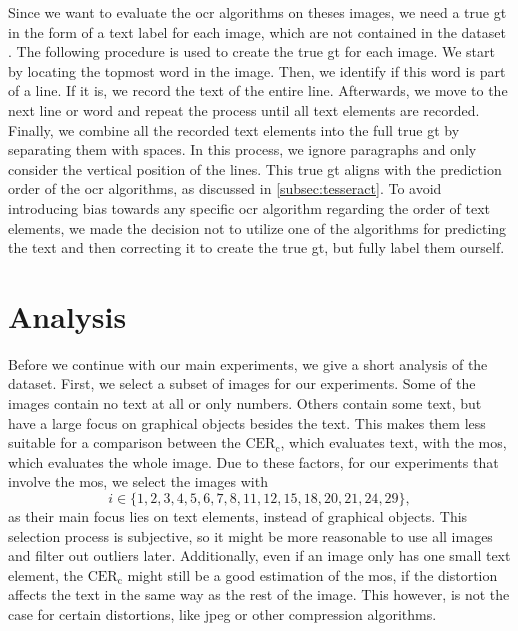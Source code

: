 Since we want to evaluate the \gls{ocr} algorithms on theses images, we need a true \gls{gt} in the form of a text label for each image, which are not contained in the dataset \cite{ni_esim_2017}.
The following procedure is used to create the true \gls{gt} for each image.
We start by locating the topmost word in the image.
Then, we identify if this word is part of a line.
If it is, we record the text of the entire line.
Afterwards, we move to the next line or word and repeat the process until all text elements are recorded.
Finally, we combine all the recorded text elements into the full true \gls{gt} by separating them with spaces.
In this process, we ignore paragraphs and only consider the vertical position of the lines.
This true \gls{gt} aligns with the prediction order of the \gls{ocr} algorithms, as discussed in \autoref{subsec:tesseract}.
To avoid introducing bias towards any specific \gls{ocr} algorithm regarding the order of text elements, we made the decision not to utilize one of the algorithms for predicting the text and then correcting it to create the true \gls{gt}, but fully label them ourself.



\section{Analysis}
\label{sec:dataset_analysis}


Before we continue with our main experiments, we give a short analysis of the dataset.
First, we select a subset of images for our experiments.
Some of the images contain no text at all or only numbers.
Others contain some text, but have a large focus on graphical objects besides the text.
This makes them less suitable for a comparison between the $\text{CER}_{\text{c}}$, which evaluates text, with the \gls{mos}, which evaluates the whole image.
Due to these factors, for our experiments that involve the \gls{mos}, we select the images with
\begin{equation}
    i \in \{1, 2, 3, 4, 5, 6, 7, 8, 11, 12, 15, 18, 20, 21, 24, 29\},
    \label{eq:mos_images}
\end{equation}
as their main focus lies on text elements, instead of graphical objects.
This selection process is subjective, so it might be more reasonable to use all images and filter out outliers later.
Additionally, even if an image only has one small text element, the $\text{CER}_{\text{c}}$ might still be a good estimation of the \gls{mos}, if the distortion affects the text in the same way as the rest of the image.
This however, is not the case for certain distortions, like \gls{jpeg} or other compression algorithms.


